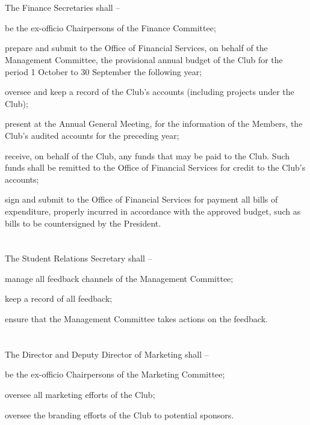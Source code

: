 \section{}
The Finance Secretaries shall –
	\begin{legal}
	\item be the ex-officio Chairpersons of the Finance Committee;
	\item prepare and submit to the Office of Financial Services, on behalf of the Management Committee, the provisional annual budget of the Club for the period 1 October to 30 September the following year;
	\item oversee and keep a record of the Club’s accounts (including projects under the Club);
	\item present at the Annual General Meeting, for the information of the Members, the Club’s audited accounts for the preceding year;
	\item receive, on behalf of the Club, any funds that may be paid to the Club. Such funds shall be remitted to the Office of Financial Services for credit to the Club’s accounts;
	\item sign and submit to the Office of Financial Services for payment all bills of expenditure, properly incurred in accordance with the approved budget, such as bills to be countersigned by the President.
	\end{legal}

\section{}
The Student Relations Secretary shall –
	\begin{legal}
	\item manage all feedback channels of the Management Committee;
	\item keep a record of all feedback;
	\item ensure that the Management Committee takes actions on the feedback.
	\end{legal}

\section{}
The Director and Deputy Director of Marketing shall –
	\begin{legal}
	\item be the ex-officio Chairpersons of the Marketing Committee;
	\item oversee all marketing efforts of the Club;
	\item oversee the branding efforts of the Club to potential sponsors.
	\end{legal}

